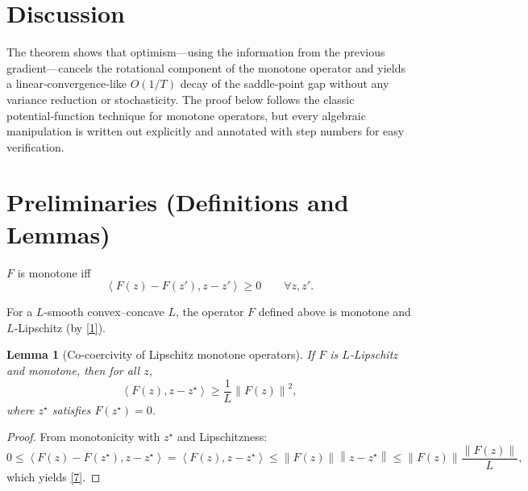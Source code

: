 \documentclass{article}
\newtheorem{lemma}{Lemma}
\newcommand{\norm}[1]{\left\lVert#1\right\rVert}
\newcommand{\inner}[2]{\left\langle #1,#2 \right\rangle}
\begin{document}
\section*{Discussion}
The theorem shows that optimism—using the information from the previous gradient—cancels the rotational component of the monotone operator and yields a linear‑convergence‑like $O(1/T)$ decay of the saddle‑point gap without any variance reduction or stochasticity. The proof below follows the classic potential‑function technique for monotone operators, but every algebraic manipulation is written out explicitly and annotated with step numbers for easy verification.

\section*{Preliminaries (Definitions and Lemmas)}
\begin{definition}
$F$ is monotone iff
\[
\inner{F(z)-F(z')}{z-z'}\ge 0\qquad\forall z,z'.
\tag{6}
\]
\end{definition}
For a $L$‑smooth convex–concave $L$, the operator $F$ defined above is monotone and $L$‑Lipschitz (by \eqref{1}).

\begin{lemma}[Co‑coercivity of Lipschitz monotone operators]\label{lem:coco}
If $F$ is $L$‑Lipschitz and monotone, then for all $z$,
\[
\inner{F(z)}{z-z^{\star}}\ge \frac{1}{L}\norm{F(z)}^{2},
\tag{7}
\]
where $z^{\star}$ satisfies $F(z^{\star})=0$.
\end{lemma}
\begin{proof}
From monotonicity with $z^{\star}$ and Lipschitzness:
\[
0\le\inner{F(z)-F(z^{\star})}{z-z^{\star}}
   =\inner{F(z)}{z-z^{\star}}
   \le \norm{F(z)}\norm{z-z^{\star}}
   \le \norm{F(z)}\frac{\norm{F(z)}}{L},
\]
which yields \eqref{7}. \hfill\qedsymbol
\end{proof}
\end{document}
